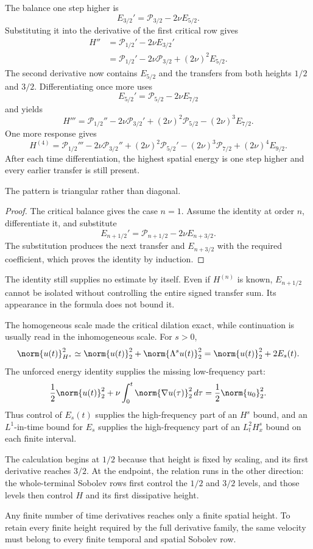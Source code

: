 The balance one step higher is
\[
  E_{3/2}'
  =
  \mathcal P_{3/2}-2\nu E_{5/2}.
\]
Substituting it into the derivative of the first critical row gives
\begin{align*}
  H''
  &=
  \mathcal P_{1/2}'-2\nu E_{3/2}'
  \\
  &=
  \mathcal P_{1/2}'
  -2\nu\mathcal P_{3/2}
  +(2\nu)^2E_{5/2}.
\end{align*}
The second derivative now contains \(E_{5/2}\) and the transfers from both heights \(1/2\) and \(3/2\).
Differentiating once more uses
\[
  E_{5/2}'
  =
  \mathcal P_{5/2}-2\nu E_{7/2}
\]
and yields
\[
  H'''
  =
  \mathcal P_{1/2}''
  -2\nu\mathcal P_{3/2}'
  +(2\nu)^2\mathcal P_{5/2}
  -(2\nu)^3E_{7/2}.
\]
One more response gives
\[
  H^{(4)}
  =
  \mathcal P_{1/2}'''
  -2\nu\mathcal P_{3/2}''
  +(2\nu)^2\mathcal P_{5/2}'
  -(2\nu)^3\mathcal P_{7/2}
  +(2\nu)^4E_{9/2}.
\]
After each time differentiation, the highest spatial energy is one step higher and every earlier transfer is still present.

The pattern is triangular rather than diagonal.
\begin{proof}
The critical balance gives the case \(n=1\).
Assume the identity at order \(n\), differentiate it, and substitute
\[
  E_{n+1/2}'
  =
  \mathcal P_{n+1/2}-2\nu E_{n+3/2}.
\]
The substitution produces the next transfer and \(E_{n+3/2}\) with the required coefficient, which proves the identity by induction.
\end{proof}
The identity still supplies no estimate by itself.
Even if \(H^{(n)}\) is known, \(E_{n+1/2}\) cannot be isolated without controlling the entire signed transfer sum.
Its appearance in the formula does not bound it.

The homogeneous scale made the critical dilation exact, while continuation is usually read in the inhomogeneous scale.
For \(s>0\),
\[
  \norm{u(t)}_{H^s}^2
  \simeq
  \norm{u(t)}_2^2+\norm{\Lambda^su(t)}_2^2
  =
  \norm{u(t)}_2^2+2E_s(t).
\]
The unforced energy identity supplies the missing low-frequency part:
\[
  \frac12\norm{u(t)}_2^2
  +
  \nu\int_0^t\norm{\nabla u(\tau)}_2^2\,d\tau
  =
  \frac12\norm{u_0}_2^2.
\]
Thus control of \(E_s(t)\) supplies the high-frequency part of an \(H^s\) bound, and an \(L^1\)-in-time bound for \(E_s\) supplies the high-frequency part of an \(L^2_tH^s_x\) bound on each finite interval.

The calculation begins at \(1/2\) because that height is fixed by scaling, and its first derivative reaches \(3/2\).
At the endpoint, the relation runs in the other direction: the whole-terminal Sobolev rows first control the \(1/2\) and \(3/2\) levels, and those levels then control \(H\) and its first dissipative height.

Any finite number of time derivatives reaches only a finite spatial height.
To retain every finite height required by the full derivative family, the same velocity must belong to every finite temporal and spatial Sobolev row.
